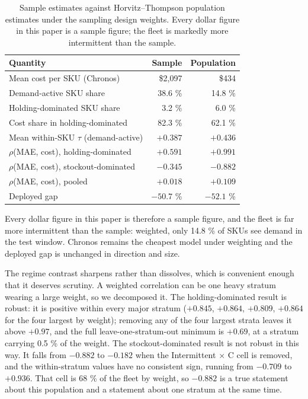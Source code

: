 \documentclass[11pt]{article}
\begin{document}
\begin{table}[htbp]
\centering
\caption{Sample estimates against Horvitz--Thompson population estimates under
the sampling design weights. Every dollar figure in this paper is a sample
figure; the fleet is markedly more intermittent than the sample.}
\label{tab:weights}
\small
\begin{tabular}{lrr}
\toprule
Quantity & Sample & Population \\
\midrule
Mean cost per SKU (Chronos) & \$2{,}097 & \$434 \\
Demand-active SKU share & 38.6 \% & 14.8 \% \\
Holding-dominated SKU share & 3.2 \% & 6.0 \% \\
Cost share in holding-dominated & 82.3 \% & 62.1 \% \\
Mean within-SKU $\tau$ (demand-active) & $+0.387$ & $+0.436$ \\
$\rho$(MAE, cost), holding-dominated & $+0.591$ & $\mathbf{+0.991}$ \\
$\rho$(MAE, cost), stockout-dominated & $-0.345$ & $\mathbf{-0.882}$ \\
$\rho$(MAE, cost), pooled & $+0.018$ & $+0.109$ \\
Deployed gap & $-50.7$ \% & $-52.1$ \% \\
\bottomrule
\end{tabular}
\end{table}

\noindent Every dollar figure in this paper is therefore a sample figure, and
the fleet is far more intermittent than the sample: weighted, only 14.8 \% of
SKUs see demand in the test window. Chronos remains the cheapest model under
weighting and the deployed gap is unchanged in direction and size.

The regime contrast sharpens rather than dissolves, which is convenient enough
that it deserves scrutiny. A weighted correlation can be one heavy stratum
wearing a large weight, so we decomposed it. The holding-dominated result is
robust: it is positive within every major stratum ($+0.845$, $+0.864$,
$+0.809$, $+0.864$ for the four largest by weight); removing any of the four
largest strata leaves it above $+0.97$, and the full leave-one-stratum-out
minimum is $+0.69$, at a stratum carrying 0.5 \% of the weight. The
stockout-dominated result is not robust in this way. It falls
from $-0.882$ to $-0.182$ when the Intermittent $\times$ C cell is removed, and
the within-stratum values have no consistent sign, running from $-0.709$ to
$+0.936$. That cell is 68 \% of the fleet by weight, so $-0.882$ is a true
statement about this population and a statement about one stratum at the same
time.
\end{document}
